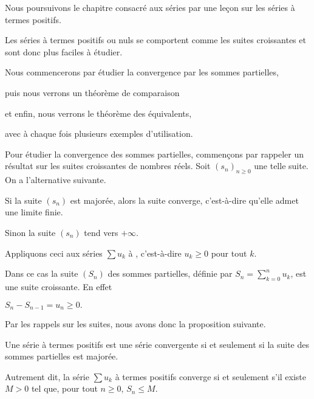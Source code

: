 






\debuttexte


\diapo

Nous poursuivons le chapitre consacré aux séries par une leçon sur les séries à termes positifs.

\change
Les séries à termes positifs ou nuls se comportent comme les suites croissantes
et sont donc plus faciles à étudier.

\change
Nous commencerons par étudier la convergence par les sommes partielles,

\change
puis nous verrons un théorème de comparaison

\change
et enfin, nous verrons le théorème des équivalents,

avec à chaque fois plusieurs exemples d'utilisation.

\diapo

Pour étudier la convergence des sommes partielles, commençons par rappeler un résultat sur les suites croissantes de nombres réels. Soit $(s_n)_{n\ge0}$ une telle suite. On a l'alternative suivante.

\change
Si la suite $(s_n)$ est majorée, alors la suite converge, c'est-à-dire qu'elle admet une limite finie.

\change
Sinon la suite $(s_n)$ tend vers $+\infty$.

\change
Appliquons ceci aux séries $\sum u_k$ à , 
c'est-à-dire $u_k\ge 0$ pour tout $k$.

\change
Dans ce cas la suite $(S_n)$ des sommes partielles, définie par 
$S_n = \sum_{k=0}^n u_k$, est une suite croissante.
En effet 

$S_{n}-S_{n-1} = u_n \ge 0.$

\change
Par les rappels sur les suites, nous avons donc la proposition suivante.

Une série à termes positifs est une série convergente si et seulement si la suite des sommes partielles est majorée.

\change
Autrement dit, la série $\sum u_k$ à termes positifs converge si et seulement s'il existe $M>0$
tel que, pour tout $n\ge 0$, $S_n \le M$.

